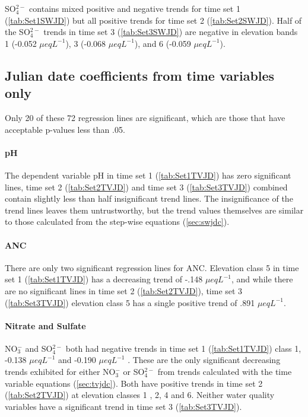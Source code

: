 SO$_4^{2-}$ contains mixed positive and negative trends for time set 1 (\autoref{tab:Set1SWJD}) but all positive trends for time set 2 (\autoref{tab:Set2SWJD}). 
Half of the SO$_4^{2-}$ trends in time set 3 (\autoref{tab:Set3SWJD}) are negative in elevation bands 1 (-0.052 $\mu eq L^{-1}$), 3 (-0.068 $\mu eq L^{-1}$), and 6 (-0.059 $\mu eq L^{-1}$).

\subsection{Julian date coefficients from time variables only}\label{sec:tvjdc} 







Only 20 of these 72 regression lines are significant,  which are those that have acceptable p-values less than .05.

\paragraph{pH}

The dependent variable pH in time set 1 (\autoref{tab:Set1TVJD}) has zero significant lines, time set 2 (\autoref{tab:Set2TVJD}) and time set 3 (\autoref{tab:Set3TVJD}) combined contain slightly less than half insignificant trend lines. 
The insignificance of the trend lines leaves them untrustworthy, but the trend values themselves are similar to those calculated from the step-wise equations (\autoref{sec:swjdc}).

\paragraph{ANC}

There are only two significant regression lines for ANC.
Elevation class 5 in time set 1 (\autoref{tab:Set1TVJD}) has a decreasing trend of -.148 $\mu eq L^{-1}$,  and while there are no significant lines in time set 2 (\autoref{tab:Set2TVJD}), time set 3 (\autoref{tab:Set3TVJD}) elevation class 5 has a single positive trend of .891 $\mu eq L^{-1}$.

\paragraph{Nitrate and Sulfate}

NO$_3^-$ and SO$_4^{2-}$ both had negative trends in time set 1 (\autoref{tab:Set1TVJD}) class 1, -0.138 $\mu eq L^{-1}$ and -0.190 $\mu eq L^{-1}$ . 
These are the only significant decreasing trends exhibited for either NO$_3^-$ or SO$_4^{2-}$  from trends calculated with the time variable equations (\autoref{sec:tvjdc}).  
Both have positive trends in time set 2 (\autoref{tab:Set2TVJD}) at elevation classes 1 , 2, 4 and 6.
Neither water quality variables have a significant trend in time set 3 (\autoref{tab:Set3TVJD}).


